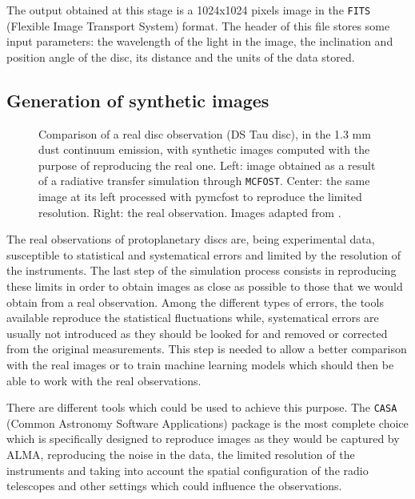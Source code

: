 \documentclass[a4paper,10pt]{report}
\begin{document}
The output obtained at this stage is a 1024x1024 pixels image in the
\lstinline{FITS} (Flexible Image Transport System) format.
The header of this file stores some input parameters: 
the wavelength of the light in the image, the inclination and position angle of
the disc, its distance and the units of the data stored.

\subsection{Generation of synthetic images}

\begin{figure}
    \begin{center}
        \scalebox{0.45}{}
    \end{center}
    \caption{Comparison of a real disc observation (DS Tau disc), in the 1.3 mm dust continuum emission,
    with synthetic images computed with the purpose of reproducing the real one.
    Left: image obtained as a result of a radiative transfer simulation through \lstinline{MCFOST}.
    Center: the same image at its left processed with pymcfost to reproduce the limited
    resolution. Right: the real observation. Images adapted from \cite{dstauv,Long_2018}.}
\end{figure}

The real observations of protoplanetary discs are, being experimental data, susceptible 
to statistical and systematical errors and limited by the resolution of the instruments.
The last step of the simulation process consists in reproducing these limits in order
to obtain images as close as possible to those that we would obtain from a real observation.
Among the different types of errors, the tools available reproduce the
statistical fluctuations while, systematical errors are usually not introduced as they should be 
looked for and removed or corrected from the original measurements.
This step is needed to allow a better comparison with the real images or to train machine learning 
models which should then be able to work with the real observations.

There are different tools which could be used to achieve this purpose.
The \lstinline{CASA} (Common Astronomy Software Applications) package \cite{casa} is the most complete choice 
which is specifically designed to reproduce images as they would be captured by ALMA, reproducing the noise in the data,
the limited resolution of the instruments and taking into account the spatial configuration of the radio telescopes
and other settings which could influence the observations.
\end{document}
